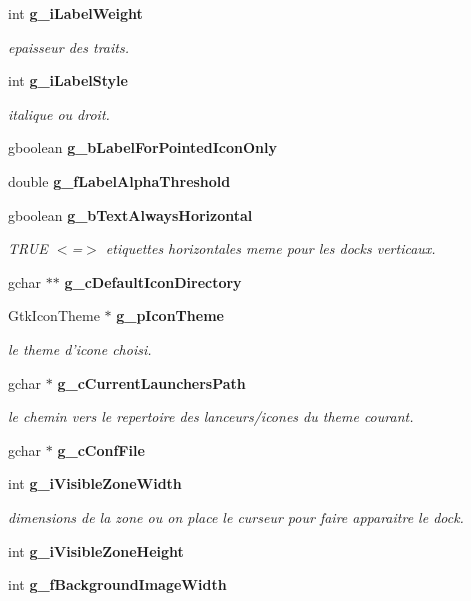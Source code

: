 \begin{CompactItemize}
int {\bf g\_\-i\-Label\-Weight}
\begin{CompactList}\small\item\em epaisseur des traits. \item\end{CompactList}\item 
int {\bf g\_\-i\-Label\-Style}
\begin{CompactList}\small\item\em italique ou droit. \item\end{CompactList}\item 
gboolean {\bf g\_\-b\-Label\-For\-Pointed\-Icon\-Only}
\item 
double {\bf g\_\-f\-Label\-Alpha\-Threshold}
\item 
gboolean {\bf g\_\-b\-Text\-Always\-Horizontal}
\begin{CompactList}\small\item\em TRUE $<$=$>$ etiquettes horizontales meme pour les docks verticaux. \item\end{CompactList}\item 
gchar $\ast$$\ast$ {\bf g\_\-c\-Default\-Icon\-Directory}
\item 
Gtk\-Icon\-Theme $\ast$ {\bf g\_\-p\-Icon\-Theme}
\begin{CompactList}\small\item\em le theme d'icone choisi. \item\end{CompactList}\item 
gchar $\ast$ {\bf g\_\-c\-Current\-Launchers\-Path}
\begin{CompactList}\small\item\em le chemin vers le repertoire des lanceurs/icones du theme courant. \item\end{CompactList}\item 
gchar $\ast$ {\bf g\_\-c\-Conf\-File}
\item 
int {\bf g\_\-i\-Visible\-Zone\-Width}
\begin{CompactList}\small\item\em dimensions de la zone ou on place le curseur pour faire apparaitre le dock. \item\end{CompactList}\item 
int {\bf g\_\-i\-Visible\-Zone\-Height}
\item 
int {\bf g\_\-f\-Background\-Image\-Width}
$$
\end{CompactItemize}
